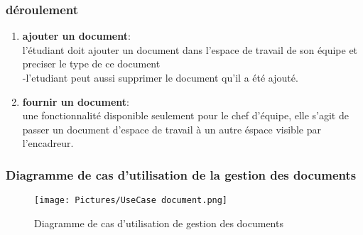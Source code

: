 \documentclass[11pt,fleqn]{book} %
\begin{document}
\subsubsection{déroulement}
\begin{enumerate}
    \item \textbf{ajouter un document}:\\ l'étudiant doit ajouter un document dans l'espace de travail de son équipe et preciser le type de ce document \\
   \hspace{2cm} -l'etudiant peut aussi supprimer le document qu'il a été ajouté.
    \item \textbf{fournir un document}:\\
    une fonctionnalité disponible seulement pour le chef d'équipe, elle s'agit de passer un document d'espace de travail à un autre éspace visible par l'encadreur.
\end{enumerate}
\subsubsection{Diagramme de cas d’utilisation de la gestion 
des documents}
\begin{figure}[h]
    \centering
    \texttt{[image: Pictures/UseCase document.png]}
    \caption{Diagramme de cas d'utilisation de gestion des documents}
    \label{fig:pca}
\end{figure}
\end{document}

